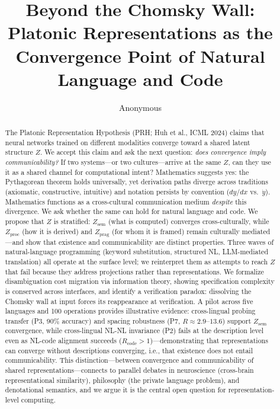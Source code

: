 \documentclass[11pt]{article}
\title{Beyond the Chomsky Wall: Platonic Representations as the\\Convergence Point of Natural Language and Code}
\author{Anonymous}
\date{}
\theoremstyle{definition}
\newcommand{\Zsem}{Z_{\text{sem}}}
\newcommand{\Zproc}{Z_{\text{proc}}}
\newcommand{\Zprag}{Z_{\text{prag}}}
\begin{document}
\maketitle

\begin{abstract}
The Platonic Representation Hypothesis (PRH; Huh et al., ICML 2024) claims that neural networks trained on different modalities converge toward a shared latent structure $Z$. We accept this claim and ask the next question: \emph{does convergence imply communicability?} If two systems---or two cultures---arrive at the same $Z$, can they use it as a shared channel for computational intent? Mathematics suggests yes: the Pythagorean theorem holds universally, yet derivation paths diverge across traditions (axiomatic, constructive, intuitive) and notation persists by convention ($dy/dx$ vs.\ $\dot{y}$). Mathematics functions as a cross-cultural communication medium \emph{despite} this divergence. We ask whether the same can hold for natural language and code. We propose that $Z$ is stratified: $\Zsem$ (what is computed) converges cross-culturally, while $\Zproc$ (how it is derived) and $\Zprag$ (for whom it is framed) remain culturally mediated---and show that existence and communicability are distinct properties. Three waves of natural-language programming (keyword substitution, structured NL, LLM-mediated translation) all operate at the surface level; we reinterpret them as attempts to reach $Z$ that fail because they address projections rather than representations. We formalize disambiguation cost migration via information theory, showing specification complexity is conserved across interfaces, and identify a verification paradox: dissolving the Chomsky wall at input forces its reappearance at verification. A pilot across five languages and 100 operations provides illustrative evidence: cross-lingual probing transfer (P3, 90\% accuracy) and spacing robustness (P7, $R \approx 2.9$--$13.6$) support $\Zsem$ convergence, while cross-lingual NL-NL invariance (P2) fails at the description level even as NL-code alignment succeeds ($R_{\text{code}} > 1$)---demonstrating that representations can converge without descriptions converging, i.e., that existence does not entail communicability. This distinction---between convergence and communicability of shared representations---connects to parallel debates in neuroscience (cross-brain representational similarity), philosophy (the private language problem), and denotational semantics, and we argue it is the central open question for representation-level computing.
\end{abstract}
\end{document}
